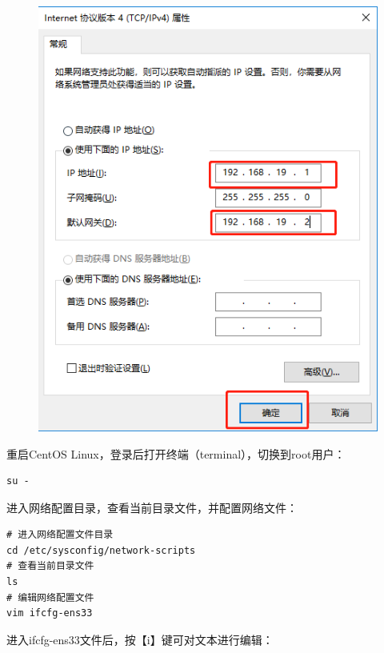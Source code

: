 \documentclass[12pt, openany, oneside]{book}
\begin{document}
\begin{figure}[H]
    \centering
    \includegraphics[scale=0.6]{img/C1/1-4/10.png}
\end{figure}

重启CentOS Linux，登录后打开终端（terminal），切换到root用户：

\vspace{-0.5cm}

\begin{lstlisting}
su -
\end{lstlisting}

进入网络配置目录，查看当前目录文件，并配置网络文件：

\vspace{-0.5cm}

\begin{lstlisting}
# 进入网络配置文件目录
cd /etc/sysconfig/network-scripts
# 查看当前目录文件
ls
# 编辑网络配置文件
vim ifcfg-ens33
\end{lstlisting}

进入ifcfg-ens33文件后，按【i】键可对文本进行编辑：

\vspace{-0.5cm}
\end{document}
